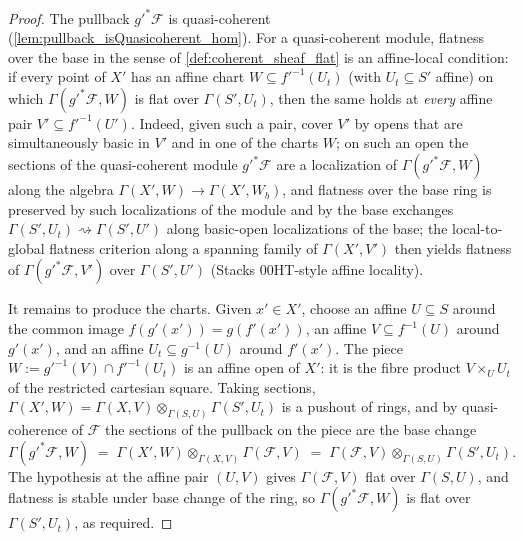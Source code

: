 \begin{proof}\leanok
  The pullback \(g'^*\mathcal{F}\) is quasi-coherent
  (\cref{lem:pullback_isQuasicoherent_hom}).  For a quasi-coherent module,
  flatness over the base in the sense of \cref{def:coherent_sheaf_flat} is an
  affine-local condition: if every point of \(X'\) has an affine chart
  \(W \subseteq f'^{-1}(U_t)\) (with \(U_t \subseteq S'\) affine) on which
  \(\Gamma(g'^*\mathcal{F}, W)\) is flat over \(\Gamma(S', U_t)\), then the
  same holds at \emph{every} affine pair
  \(V' \subseteq f'^{-1}(U')\).  Indeed, given such a pair, cover \(V'\) by
  opens that are simultaneously basic in \(V'\) and in one of the charts
  \(W\); on such an open the sections of the quasi-coherent module
  \(g'^*\mathcal{F}\) are a localization of \(\Gamma(g'^*\mathcal{F}, W)\)
  along the algebra \(\Gamma(X', W) \to \Gamma(X', W_b)\), and flatness over
  the base ring is preserved by such localizations of the module and by the
  base exchanges \(\Gamma(S', U_t) \rightsquigarrow \Gamma(S', U')\) along
  basic-open localizations of the base; the local-to-global flatness
  criterion along a spanning family of \(\Gamma(X', V')\) then yields
  flatness of \(\Gamma(g'^*\mathcal{F}, V')\) over \(\Gamma(S', U')\)
  (Stacks 00HT-style affine locality).

  It remains to produce the charts.  Given \(x' \in X'\), choose an affine
  \(U \subseteq S\) around the common image \(f(g'(x')) = g(f'(x'))\), an
  affine \(V \subseteq f^{-1}(U)\) around \(g'(x')\), and an affine
  \(U_t \subseteq g^{-1}(U)\) around \(f'(x')\).  The piece
  \(W := g'^{-1}(V) \cap f'^{-1}(U_t)\) is an affine open of \(X'\): it is
  the fibre product \(V \times_U U_t\) of the restricted cartesian square.
  Taking sections, \(\Gamma(X', W) =
  \Gamma(X, V) \otimes_{\Gamma(S, U)} \Gamma(S', U_t)\) is a pushout of
  rings, and by quasi-coherence of \(\mathcal{F}\) the sections of the
  pullback on the piece are the base change
  \[
    \Gamma(g'^*\mathcal{F}, W)
      \;=\; \Gamma(X', W) \otimes_{\Gamma(X, V)} \Gamma(\mathcal{F}, V)
      \;=\; \Gamma(\mathcal{F}, V) \otimes_{\Gamma(S, U)} \Gamma(S', U_t).
  \]
  The hypothesis at the affine pair \((U, V)\) gives
  \(\Gamma(\mathcal{F}, V)\) flat over \(\Gamma(S, U)\), and flatness is
  stable under base change of the ring, so \(\Gamma(g'^*\mathcal{F}, W)\) is
  flat over \(\Gamma(S', U_t)\), as required.
\end{proof}


